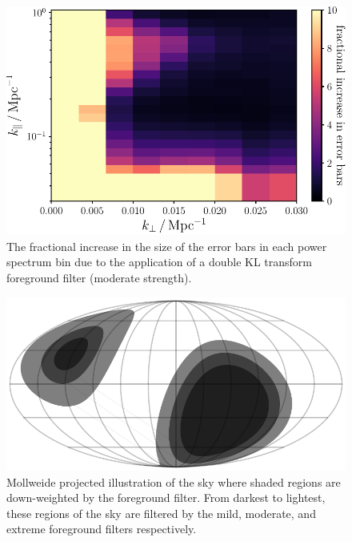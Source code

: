 \begin{bibunit}
\begin{figure}[t]
    \centering
    \includegraphics[width=\columnwidth]{figures/chapter4/cylindrical-power-spectrum-error-bars}
    \caption{
        The fractional increase in the size of the error bars in each power spectrum bin due to the
        application of a double KL transform foreground filter (moderate strength).
    }
    \label{fig:error-bars-increase}
\end{figure}

\begin{figure}[t]
    \centering
    \includegraphics[width=\columnwidth]{figures/chapter4/foreground-filtering-schematic}
    \caption{
        Mollweide projected illustration of the sky where shaded regions are down-weighted by the
        foreground filter. From darkest to lightest, these regions of the sky are filtered by the
        mild, moderate, and extreme foreground filters respectively.
    }
    \label{fig:foreground-filtering-schematic}
\end{figure}


\end{bibunit}
